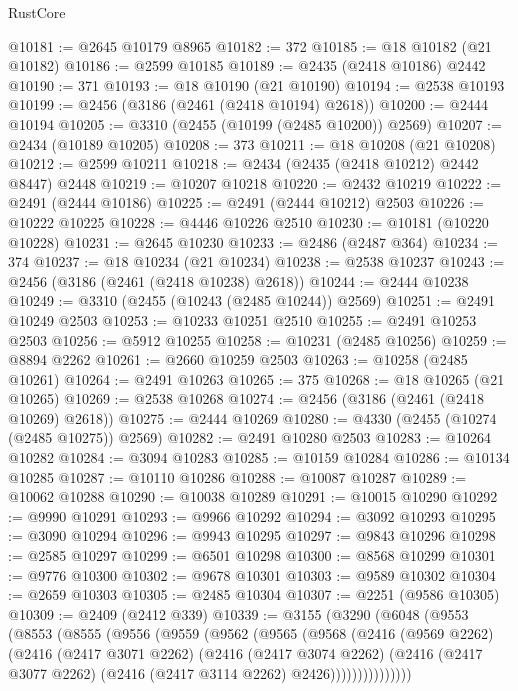 \begin{lexlean}{RustCore}
\begin{coremodule}
@10181 := @2645 @10179 @8965
@10182 := 372
@10185 := @18 @10182 (@21 @10182)
@10186 := @2599 @10185
@10189 := @2435 (@2418 @10186) @2442
@10190 := 371
@10193 := @18 @10190 (@21 @10190)
@10194 := @2538 @10193
@10199 := @2456 (@3186 (@2461 (@2418 @10194) @2618))
@10200 := @2444 @10194
@10205 := @3310 (@2455 (@10199 (@2485 @10200)) @2569)
@10207 := @2434 (@10189 @10205)
@10208 := 373
@10211 := @18 @10208 (@21 @10208)
@10212 := @2599 @10211
@10218 := @2434 (@2435 (@2418 @10212) @2442 @8447) @2448
@10219 := @10207 @10218
@10220 := @2432 @10219
@10222 := @2491 (@2444 @10186)
@10225 := @2491 (@2444 @10212) @2503
@10226 := @10222 @10225
@10228 := @4446 @10226 @2510
@10230 := @10181 (@10220 @10228)
@10231 := @2645 @10230
@10233 := @2486 (@2487 @364)
@10234 := 374
@10237 := @18 @10234 (@21 @10234)
@10238 := @2538 @10237
@10243 := @2456 (@3186 (@2461 (@2418 @10238) @2618))
@10244 := @2444 @10238
@10249 := @3310 (@2455 (@10243 (@2485 @10244)) @2569)
@10251 := @2491 @10249 @2503
@10253 := @10233 @10251 @2510
@10255 := @2491 @10253 @2503
@10256 := @5912 @10255
@10258 := @10231 (@2485 @10256)
@10259 := @8894 @2262
@10261 := @2660 @10259 @2503
@10263 := @10258 (@2485 @10261)
@10264 := @2491 @10263
@10265 := 375
@10268 := @18 @10265 (@21 @10265)
@10269 := @2538 @10268
@10274 := @2456 (@3186 (@2461 (@2418 @10269) @2618))
@10275 := @2444 @10269
@10280 := @4330 (@2455 (@10274 (@2485 @10275)) @2569)
@10282 := @2491 @10280 @2503
@10283 := @10264 @10282
@10284 := @3094 @10283
@10285 := @10159 @10284
@10286 := @10134 @10285
@10287 := @10110 @10286
@10288 := @10087 @10287
@10289 := @10062 @10288
@10290 := @10038 @10289
@10291 := @10015 @10290
@10292 := @9990 @10291
@10293 := @9966 @10292
@10294 := @3092 @10293
@10295 := @3090 @10294
@10296 := @9943 @10295
@10297 := @9843 @10296
@10298 := @2585 @10297
@10299 := @6501 @10298
@10300 := @8568 @10299
@10301 := @9776 @10300
@10302 := @9678 @10301
@10303 := @9589 @10302
@10304 := @2659 @10303
@10305 := @2485 @10304
@10307 := @2251 (@9586 @10305)
@10309 := @2409 (@2412 @339)
@10339 := @3155
    (@3290
      (@6048
        (@9553
          (@8553
            (@8555
              (@9556
                (@9559
                  (@9562
                    (@9565
                      (@9568
                        (@2416
                          (@9569 @2262)
                          (@2416
                            (@2417 @3071 @2262)
                            (@2416
                              (@2417 @3074 @2262)
                              (@2416
                                (@2417 @3077 @2262)
                                (@2416 (@2417 @3114 @2262) @2426)))))))))))))))

\end{coremodule}
\end{lexlean}
